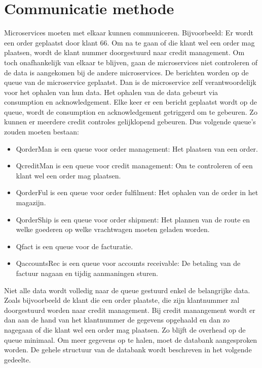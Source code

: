 \section{Communicatie methode}
Microservices moeten met elkaar kunnen communiceren. Bijvoorbeeld: Er wordt een order geplaatst door klant 66. Om na te gaan of die klant wel een order mag plaatsen, wordt de klant nummer doorgestuurd naar credit management. Om toch onafhankelijk van elkaar te blijven, gaan de microservices niet controleren of de data is aangekomen bij de andere microservices. De berichten worden op de queue van de microservice geplaatst. Dan is de microservice zelf verantwoordelijk voor het ophalen van hun data. Het ophalen van de data gebeurt via consumption en acknowledgement. Elke keer er een bericht geplaatst wordt op de queue, wordt de consumption en acknowledgement getriggerd om te gebeuren. Zo kunnen er meerdere credit controles gelijklopend gebeuren. 
Dus volgende queue's zouden moeten bestaan:
\begin{itemize}
	\item QorderMan is een queue voor order management: Het plaatsen van een order.
	\item QcreditMan is een queue voor credit management: Om te controleren of een klant wel een order mag plaatsen.
	\item QorderFul is een queue voor order fulfilment: Het ophalen van de order in het magazijn.
	\item QorderShip is een queue voor order shipment: Het plannen van de route en welke goederen op welke vrachtwagen moeten geladen worden.
	\item Qfact is een queue voor de facturatie.
	\item QaccountsRec is een queue voor accounts receivable: De betaling van de factuur nagaan en tijdig aanmaningen sturen. 
\end{itemize}

Niet alle data wordt volledig naar de queue gestuurd enkel de belangrijke data. Zoals bijvoorbeeld de klant die een order plaatste, die zijn klantnummer zal doorgestuurd worden naar credit management. Bij credit manangement wordt er dan aan de hand van het klantnummer de gegevens opgehaald en dan zo nagegaan of die klant wel een order mag plaatsen. Zo blijft de overhead op de queue minimaal. Om meer gegevens op te halen, moet de databank aangesproken worden. De gehele structuur van de databank wordt beschreven in het volgende gedeelte.

